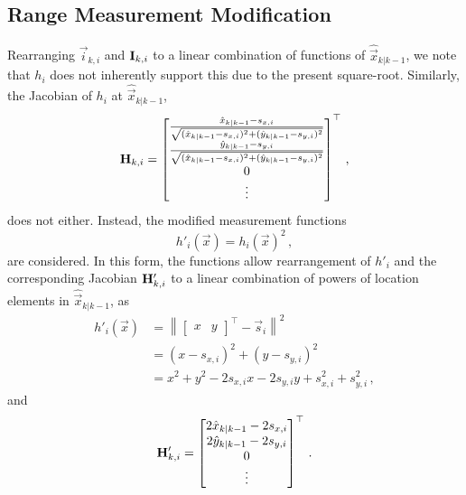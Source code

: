 \subsection{Range Measurement Modification}\label{subsec:nonlin_fusion:measurement_modification}
Rearranging $\vec{i}_{k, i}$ and ${{\mathbf{I}}}_{k, i}$ to a linear combination of functions of $\hat{\vec{x}}_{k|k-1}$, we note that $h_i$ does not inherently support this due to the present square-root. Similarly, the Jacobian of $h_i$ at $\hat{\vec{x}}_{k|k-1}$,
\begin{equation}
    {\ensuremath{{\mathbf{H}}}}_{k,i} = 
    \begin{bmatrix}
        \frac{\hat{x}_{k|k-1} - s_{x,i}}{\sqrt{(\hat{x}_{k|k-1} - s_{x,i})^2 + (\hat{y}_{k|k-1} - s_{y,i})^2}} \\
        \frac{\hat{y}_{k|k-1} - s_{y,i}}{\sqrt{(\hat{x}_{k|k-1} - s_{x,i})^2 + (\hat{y}_{k|k-1} - s_{y,i})^2}} \\
        0 \\
        \vdots
    \end{bmatrix}^\top\,,
\end{equation}
does not either. Instead, the modified measurement functions
\begin{equation}\label{eq:nonlin_fusion:modified_measurement_func}
    h'_i(\vec{x}) = h_i(\vec{x})^2\,,
\end{equation}
are considered. In this form, the functions allow rearrangement of $h'_i$ and the corresponding Jacobian ${{\mathbf{H}}}'_{k,i}$ to a linear combination of powers of location elements in $\hat{\vec{x}}_{k|k-1}$, as
\begin{equation}
    \begin{split}
        h'_i(\vec{x}) &= \left\lVert
        \begin{bmatrix}
            x & y
        \end{bmatrix}^\top - \vec{s}_i\right\rVert^2 \\
        &= (x - s_{x,i})^2 + (y - s_{y,i})^2 \\
        &= x^2 + y^2 -2s_{x,i}x -2s_{y,i}y +s_{x,i}^2 +s_{y,i}^2\,,
    \end{split}
\end{equation}
and
\begin{equation}\label{eq:nonlin_fusion:modified_jacobian}
    {\ensuremath{{\mathbf{H}}}}'_{k,i} = 
    \begin{bmatrix}
        2\hat{x}_{k|k-1} - 2s_{x,i} \\
        2\hat{y}_{k|k-1} - 2s_{y,i} \\
        0 \\
        \vdots
    \end{bmatrix}^\top\,.
\end{equation}
